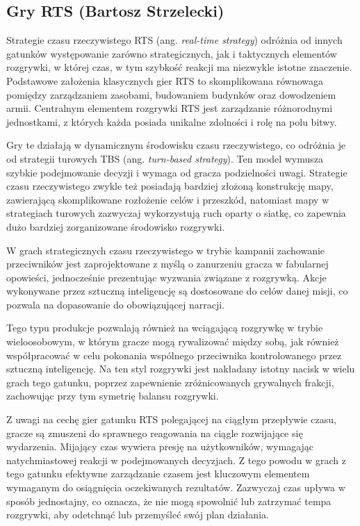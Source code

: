 \subsection{Gry RTS (Bartosz Strzelecki)}\label{ss:rts}
Strategie czasu rzeczywistego RTS (ang. \textit{real-time strategy}) odróżnia od innych gatunków występowanie zarówno strategicznych, jak i taktycznych
elementów rozgrywki, w której czas, w tym szybkość reakcji ma niezwykle istotne znaczenie. Podstawowe założenia klasycznych gier RTS to skomplikowana równowaga pomiędzy zarządzaniem zasobami, budowaniem budynków oraz
dowodzeniem armii. Centralnym elementem rozgrywki RTS jest zarządzanie różnorodnymi jednostkami, z których każda posiada unikalne zdolności i rolę na polu bitwy.

Gry te działają w dynamicznym środowisku czasu rzeczywistego, co odróżnia je od strategii turowych TBS (ang. \textit{turn-based strategy}). Ten model wymusza szybkie podejmowanie decyzji
i wymaga od gracza podzielności uwagi. Strategie czasu rzeczywistego zwykle też posiadają bardziej złożoną konstrukcję mapy, zawierającą skomplikowane
rozłożenie celów i przeszkód, natomiast mapy w strategiach turowych zazwyczaj wykorzystują ruch oparty o siatkę, co zapewnia dużo bardziej
zorganizowane środowisko rozgrywki.

W grach strategicznych czasu rzeczywistego w trybie kampanii zachowanie przeciwników jest zaprojektowane z myślą o zanurzeniu gracza w fabularnej opowieści, jednocześnie
prezentując wyzwania związane z rozgrywką. Akcje wykonywane przez sztuczną inteligencję są dostosowane do celów danej misji, co pozwala
na dopasowanie do obowiązującej narracji.

Tego typu produkcje pozwalają również na wciągającą rozgrywkę w trybie wieloosobowym, w którym gracze mogą rywalizować między sobą, jak również
współpracować w celu pokonania wspólnego przeciwnika kontrolowanego przez sztuczną inteligencję. Na ten styl rozgrywki jest nakładany istotny nacisk
w wielu grach tego gatunku, poprzez zapewnienie zróżnicowanych grywalnych frakcji, zachowując przy tym symetrię balansu rozgrywki.

Z uwagi na cechę gier gatunku RTS polegającej na ciągłym przepływie czasu, gracze są zmuszeni
do sprawnego reagowania na ciągle rozwijające się wydarzenia. Mijający czas
wywiera presję na użytkowników, wymagając natychmiastowej reakcji w podejmowanych decyzjach.
Z tego powodu w grach z tego gatunku efektywne zarządzanie czasem jest kluczowym elementem
wymaganym do osiągnięcia oczekiwanych rezultatów. Zazwyczaj czas upływa w sposób jednostajny, co oznacza, że
nie mogą spowolnić lub zatrzymać tempa rozgrywki, aby odetchnąć lub przemyśleć swój plan działania.

